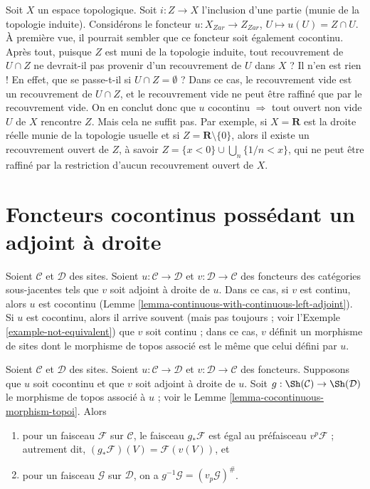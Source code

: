 \begin{example}
\label{example-closed-map-cocontinuous-false}
Soit $X$ un espace topologique.
Soit $i : Z  \to X$ l’inclusion d’une partie (munie de la topologie induite).
Considérons le foncteur $u : X_{Zar} \to Z_{Zar}$,
$U \mapsto u(U) = Z \cap U$.
À première vue, il pourrait sembler que ce foncteur soit également
cocontinu. Après tout, puisque $Z$ est muni de la topologie induite, tout
recouvrement de $U\cap Z$ ne devrait-il pas provenir d’un recouvrement de
$U$ dans $X$ ? Il n’en est rien ! En effet, que se passe-t-il si
$U \cap Z = \emptyset$ ? Dans ce cas, le recouvrement vide est un recouvrement
de $U \cap Z$, et le recouvrement vide ne peut être raffiné que par le
recouvrement vide. On en conclut donc que
$u$ cocontinu $\Rightarrow$ tout ouvert non vide $U$ de $X$ rencontre $Z$.
Mais cela ne suffit pas. Par exemple, si $X = \mathbf{R}$ est la droite réelle
munie de la topologie usuelle et si $Z = \mathbf{R} \setminus \{0\}$, alors
il existe un recouvrement ouvert de $Z$, à savoir
$Z = \{x < 0\} \cup \bigcup_n \{1/n < x\}$, qui ne peut être raffiné par la
restriction d’aucun recouvrement ouvert de $X$.
\end{example}






\section{Foncteurs cocontinus possédant un adjoint à droite}
\label{section-cocontinuous-adjoint}

\noindent
Soient $\mathcal{C}$ et $\mathcal{D}$ des sites. Soient
$u : \mathcal{C} \to \mathcal{D}$ et $v : \mathcal{D} \to \mathcal{C}$ des
foncteurs des catégories sous-jacentes tels que $v$ soit adjoint à droite de
$u$. Dans ce cas, si $v$ est continu, alors $u$ est cocontinu
(Lemme \ref{lemma-continuous-with-continuous-left-adjoint}).
Si $u$ est cocontinu, alors il arrive souvent (mais pas toujours ; voir
l’Exemple \ref{example-not-equivalent}) que $v$ soit continu ; dans ce cas,
$v$ définit un morphisme de sites dont le morphisme de topos associé est le
même que celui défini par $u$.

\begin{lemma}
\label{lemma-have-functor-other-way}
Soient $\mathcal{C}$ et $\mathcal{D}$ des sites. Soient
$u : \mathcal{C} \to \mathcal{D}$ et $v : \mathcal{D} \to \mathcal{C}$ des
foncteurs. Supposons que $u$ soit cocontinu et que $v$ soit adjoint à droite de
$u$. Soit $g : \Sh(\mathcal{C}) \to \Sh(\mathcal{D})$ le morphisme de topos
associé à $u$ ; voir le Lemme \ref{lemma-cocontinuous-morphism-topoi}.
Alors
\begin{enumerate}
\item pour un faisceau $\mathcal{F}$ sur $\mathcal{C}$, le faisceau
$g_*\mathcal{F}$ est égal au préfaisceau $v^p\mathcal{F}$ ; autrement dit,
$(g_*\mathcal{F})(V) = \mathcal{F}(v(V))$, et
\item pour un faisceau $\mathcal{G}$ sur $\mathcal{D}$, on a
$g^{-1}\mathcal{G} = (v_p\mathcal{G})^\#$.
\end{enumerate}
\end{lemma}

